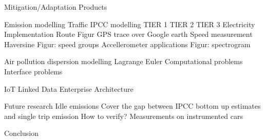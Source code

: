 
Mitigation/Adaptation
	Products

Emission modelling
	Traffic
		IPCC modelling
			TIER 1
			TIER 2
			TIER 3						
	Electricity
	Implementation
		Route 
			Figur GPS trace over Google earth
		Speed measurement
			Haversine
			Figur: speed groups
		Accellerometer applications
			Figur: spectrogram

Air pollution dispersion modelling
	Lagrange
	Euler
	Computational problems
	Interface problems

IoT
	Linked Data
	Enterprise Architecture
	
Future research
	Idle emissions
	Cover the gap between IPCC bottom up estimates and single trip emission 
		How to verify?
			Measurements on instrumented cars
	
Conclusion	
		